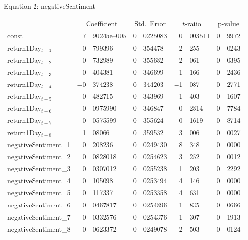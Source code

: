 \begin{center}

Equation 2: negativeSentiment\\

\vspace{1em}

\begin{tabular}{lr@{.}lr@{.}lr@{.}lr@{.}l}
    &
    \multicolumn{2}{c}{Coefficient} &
    \multicolumn{2}{c}{Std.\ Error} &
    \multicolumn{2}{c}{$t$-ratio} &
    \multicolumn{2}{c}{p-value} \\[1ex]
const &
    7&90245\textrm{e--005} &
    0&0225083 &
        0&003511 &
        0&9972 \\
return1Day$_{t-1}$ &
    0&799396 &
    0&354478 &
        2&255 &
        0&0243 \\
return1Day$_{t-2}$ &
    0&732989 &
    0&355682 &
        2&061 &
        0&0395 \\
return1Day$_{t-3}$ &
    0&404381 &
    0&346699 &
        1&166 &
        0&2436 \\
return1Day$_{t-4}$ &
    $-$0&374238 &
    0&344203 &
        $-$1&087 &
        0&2771 \\
return1Day$_{t-5}$ &
    0&482715 &
    0&343969 &
        1&403 &
        0&1607 \\
return1Day$_{t-6}$ &
    0&0975990 &
    0&346847 &
        0&2814 &
        0&7784 \\
return1Day$_{t-7}$ &
    $-$0&0575599 &
    0&355624 &
        $-$0&1619 &
        0&8714 \\
return1Day$_{t-8}$ &
    1&08066 &
    0&359532 &
        3&006 &
        0&0027 \\
negativeSentiment\_1 &
    0&208236 &
    0&0249430 &
        8&348 &
        0&0000 \\
negativeSentiment\_2 &
    0&0828018 &
    0&0254623 &
        3&252 &
        0&0012 \\
negativeSentiment\_3 &
    0&0307012 &
    0&0255238 &
        1&203 &
        0&2292 \\
negativeSentiment\_4 &
    0&105098 &
    0&0253494 &
        4&146 &
        0&0000 \\
negativeSentiment\_5 &
    0&117337 &
    0&0253358 &
        4&631 &
        0&0000 \\
negativeSentiment\_6 &
    0&0467817 &
    0&0254896 &
        1&835 &
        0&0666 \\
negativeSentiment\_7 &
    0&0332576 &
    0&0254376 &
        1&307 &
        0&1913 \\
negativeSentiment\_8 &
    0&0623372 &
    0&0249078 &
        2&503 &
        0&0124 \\
\end{tabular}


\end{center}
